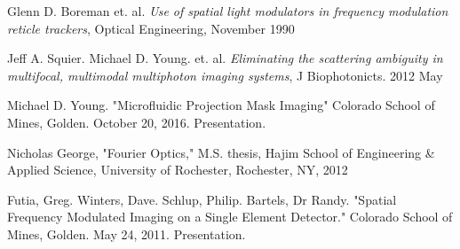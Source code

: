 \documentclass[a0paper,portrait]{baposter}
\begin{document}
\begin{poster}
{\begin{thebibliography}{9}
	Glenn D. Boreman et. al.
	\emph{Use of spatial light modulators in frequency modulation reticle trackers},
	Optical Engineering, November 1990

	Jeff A. Squier. Michael D. Young. et. al.
	\emph{Eliminating the scattering ambiguity in multifocal, multimodal multiphoton imaging systems},
	J Biophotonicts. 2012 May

	Michael D. Young.
	"Microfluidic Projection Mask Imaging"
	Colorado School of Mines, Golden. October 20, 2016. Presentation.

	Nicholas George,
	"Fourier Optics," M.S. thesis, Hajim School of Engineering \& Applied Science, University of Rochester, Rochester, NY, 2012

  
  Futia, Greg. Winters, Dave. Schlup, Philip. Bartels, Dr Randy.
  "Spatial Frequency Modulated Imaging on a Single Element Detector."
  Colorado School of Mines, Golden. May 24, 2011. Presentation.
  

\end{thebibliography}
}


\end{poster}
\end{document}
